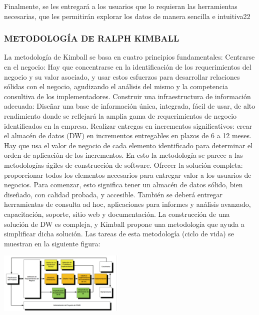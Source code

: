 \documentclass[twoside,twocolumn]{article}
\begin{document}
Finalmente, se les entregará a los usuarios que lo 
requieran las herramientas necesarias, que les permitirán explorar los 
datos de manera sencilla e intuitiva22 

\subsubsection{METODOLOGÍA DE RALPH KIMBALL }
La metodología de Kimball se basa en cuatro principios fundamentales: 
Centrarse en el negocio: Hay que concentrarse en la identificación de 
los requerimientos del negocio y su valor asociado, y usar estos 
esfuerzos para desarrollar relaciones sólidas con el negocio, agudizando 
el análisis del mismo y la competencia consultiva de los 
implementadores. 
Construir una infraestructura de información adecuada: Diseñar una 
base de información única, integrada, fácil de usar, de alto rendimiento 
donde se reflejará la amplia gama de requerimientos de negocio 
identificados en la empresa. 
Realizar entregas en incrementos significativos: crear el almacén de 
datos (DW) en incrementos entregables en plazos de 6 a 12 meses. Hay 
que usa el valor de negocio de cada elemento identificado para 
determinar el orden de aplicación de los incrementos. En esto la 
metodología se parece a las metodologías ágiles de construcción de 
software. 
Ofrecer la solución completa: proporcionar todos los elementos 
necesarios para entregar valor a los usuarios de negocios. Para 
comenzar, esto significa tener un almacén de datos sólido, bien diseñado, 
con calidad probada, y accesible. También se deberá entregar 
herramientas de consulta ad hoc, aplicaciones para informes y análisis 
avanzado, capacitación, soporte, sitio web y documentación. 
La construcción de una solución de DW es compleja, y Kimball propone una 
metodología que ayuda a simplificar dicha solución. Las tareas de esta 
metodología (ciclo de vida) se muestran en la siguiente figura:

\includegraphics[width=6cm]{imagenes/img2.png}
\end{document}
